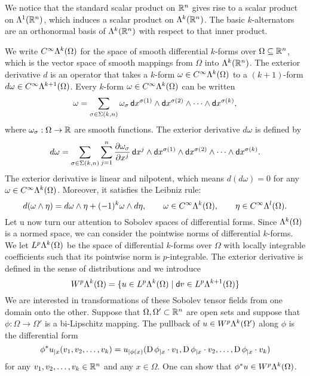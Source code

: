 \documentclass[a4paper]{article}
\begin{document}
We notice that the standard scalar product on ${\mathbb R}^{n}$ gives rise to a scalar product on $\Lambda^{1}({\mathbb R}^{n})$,
which induces a scalar product on $\Lambda^{k}({\mathbb R}^{n})$.
The basic $k$-alternators are an orthonormal basis of $\Lambda^{k}({\mathbb R}^{n})$ with respect to that inner product. 

We write $C^{\infty}\Lambda^{k}(\Omega)$ for the space of smooth differential $k$-forms over $\Omega \subseteq {\mathbb R}^{n}$,
which is the vector space of smooth mappings from $\Omega$ into $\Lambda^{k}({\mathbb R}^{n})$.
The exterior derivative \( d \) is an operator that takes a \( k \)-form \( \omega \in C^{\infty}\Lambda^{k}(\Omega) \) 
to a \((k+1)\)-form \( d\omega \in C^{\infty}\Lambda^{k+1}(\Omega) \). 
Every \( k \)-form \( \omega \in C^{\infty}\Lambda^{k}(\Omega) \) can be written 
\[
    \omega = 
    \sum_{ \sigma \in \Sigma(k,n) } 
    \omega_{\sigma} \, 
    {\mathsf d}x^{\sigma(1)} \wedge {\mathsf d}x^{\sigma(2)} \wedge \cdots \wedge {\mathsf d}x^{\sigma(k)},
\]
where \( \omega_{\sigma} : \Omega \rightarrow {\mathbb R} \) are smooth functions.
The exterior derivative \( d\omega \) is defined by
\[
    d\omega = 
    \sum_{ \sigma \in \Sigma(k,n) } 
    \sum_{j=1}^{n} 
    \frac{\partial \omega_{\sigma}}{\partial x^j} 
    \, {\mathsf d}x^j \wedge 
    {\mathsf d}x^{\sigma(1)} \wedge {\mathsf d}x^{\sigma(2)} \wedge \cdots \wedge {\mathsf d}x^{\sigma(k)}.
\]
The exterior derivative is linear and nilpotent, which means 
\( d(d\omega) = 0 \) for any \( \omega \in C^{\infty}\Lambda^{k}(\Omega) \).
Moreover, it satisfies the Leibniz rule:
\[ 
    d(\omega \wedge \eta) 
    = 
    d\omega \wedge \eta + (-1)^{k} \omega \wedge d\eta, 
    \qquad \omega \in C^{\infty}\Lambda^{k}(\Omega), 
    \qquad \eta \in C^{\infty}\Lambda^{l}(\Omega).
\]
Let u now turn our attention to Sobolev spaces of differential forms. 
Since $\Lambda^{k}(\Omega)$ is a normed space, we can consider the pointwise norms of differential $k$-forms. 
We let $L^{p}\Lambda^{k}(\Omega)$ be the space of differential $k$-forms over $\Omega$ with locally integrable coefficients 
such that its pointwise norm is $p$-integrable. 
The exterior derivative is defined in the sense of distributions and we introduce 
\[
    W^p\Alt^{k}(\Omega) = \{ u \in L^{p}\Alt^{k}(\Omega) \suchthat \cartan v \in L^{p}\Alt^{k+1}(\Omega) \}
\]
We are interested in transformations of these Sobolev tensor fields from one domain onto the other. 
Suppose that $\Omega,\Omega' \subset {\mathbb R}^{n}$ are open sets and suppose that $\phi: \Omega \to \Omega'$ is a bi-Lipschitz mapping.
The pullback of $u \in W^p\Lambda^{k}(\Omega')$ along $\phi$ is the differential form 
\[ 
    \phi^{\ast}u_{|x}( v_{1}, v_{2}, \ldots, v_{k} ) 
    = 
    u_{|\phi(x)}( \operatorname{D}\phi_{|x} \cdot v_1, \operatorname{D}\phi_{|x} \cdot v_2, \ldots, \operatorname{D}\phi_{|x} \cdot v_k ) 
\]
for any $v_1, v_2, \dots, v_k \in {\mathbb R}^{n}$ and any $x \in \Omega$. One can show that $\phi^{\ast}u \in W^p\Lambda^{k}(\Omega)$.
\end{document}
